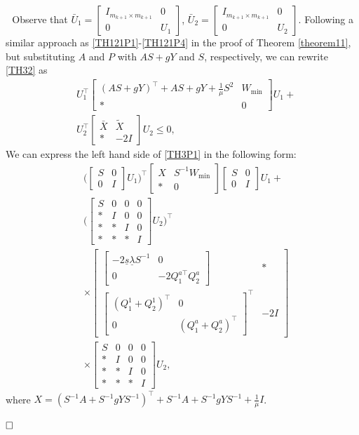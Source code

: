 \documentclass[10pt,a4paper]{amsart}
\newcommand{\bbm}[1]{\left[\begin{matrix} #1 \end{matrix}\right]}
\renewenvironment{proof}{\vspace{.1cm}\noindent{\sc Proof.}\hspace{0.10cm}\,\,}{$\hfill\Box$\vspace{.1cm}}
\begin{document}
\begin{proof}
Observe that $\bar{U}_1=\bbm{I_{m_{k+1}\times m_{k+1}}&0\\0&U_1}$, $\bar{U}_2=\bbm{I_{m_{k+1}\times m_{k+1}}&0\\0&U_2}$. Following a similar approach as \eqref{TH121P1}-\eqref{TH121P4} in the proof of Theorem \ref{theorem11}, but substituting $A$ and $P$ with $AS + gY$ and $S$, respectively, we can rewrite \eqref{TH32} as
\begin{equation}\label{TH3P1}
\begin{aligned}
&U_1^\top
\bbm{
(AS+gY)^\top + AS + gY+\frac{1}{\mu}S^2 & W_{\min} \\
\ast & 0
}
U_1 + \\
&U_2^\top
\bbm{
\bar{X} &\tilde{X} \\
\ast & -2I
}
U_2 \leq 0, 
\end{aligned}
\end{equation}
We can express the left hand side of \eqref{TH3P1} in the following form:
\begin{equation}\label{TH3P40}
\begin{aligned}
&\Big(\bbm{
S&0\\0&I
}U_1\Big)^\top
\bbm{
X & S^{-1}W_{\min} \\
\ast & 0
}
\bbm{
S&0\\0&I
}U_1 + \\
&\Big(\bbm{
S&0&0&0\\\ast&I&0&0\\\ast&\ast&I&0\\\ast&\ast&\ast&I
}U_2\Big)^\top\\&\times
\bbm{\bbm{-2\underline{s}\underline{\lambda}S^{-1}&0\\0&-2Q^{a\top}_1 Q^a_2}
 &*\\
\bbm{(Q^1_1+Q^1_2)^\top&0\\0&(Q^a_1+Q^a_2)^\top}^\top  & -2I
}
\\&\times\bbm{
S&0&0&0\\\ast&I&0&0\\\ast&\ast&I&0\\\ast&\ast&\ast&I
}U_2, 
\end{aligned}
\end{equation}
where $X=(S^{-1}A + S^{-1}gYS^{-1})^\top + S^{-1}A + S^{-1}gYS^{-1}+\frac{1}{\mu}I$.


\end{proof}
\end{document}
